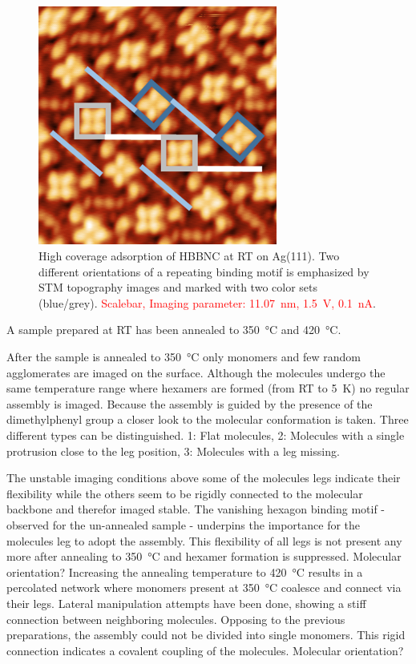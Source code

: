 \begin{figure}[] \centering
	\includegraphics[width=0.7\textwidth]{./images/hbbnc-ag-111-rt-high-coverage}
	\caption{High coverage adsorption of HBBNC at RT on Ag(111). Two different orientations of a repeating binding motif is emphasized by STM topography images and marked with two color sets (blue/grey). \textcolor{red}{Scalebar, Imaging parameter: \SI{11.07}{\nano \meter}, \SI{1.5}{\volt}, \SI{0.1}{\nano \ampere}}.}
	\label{}
\end{figure}

A sample prepared at RT has been annealed to \SI{350}{\celsius} and \SI{420}{\celsius}.

After the sample is annealed to \SI{350}{\celsius} only monomers and few random agglomerates are imaged on the surface. Although the molecules undergo the same temperature range where hexamers are formed (from RT to \SI{5}{\kelvin}) no regular assembly is imaged. Because the assembly is guided by the presence of the dimethylphenyl group a closer look to the molecular conformation is taken. Three different types can be distinguished. 1: Flat molecules, 2: Molecules with a single protrusion close to the leg position, 3: Molecules with a leg missing.

The unstable imaging conditions above some of the molecules legs indicate their flexibility while the others seem to be rigidly connected to the molecular backbone and therefor imaged stable. The vanishing hexagon binding motif - observed for the un-annealed sample - underpins the importance for the molecules leg to adopt the assembly. This flexibility of all legs is not present any more after annealing to \SI{350}{\celsius} and hexamer formation is suppressed. Molecular orientation?
Increasing the annealing temperature to \SI{420}{\celsius} results in a percolated network where monomers present at \SI{350}{\celsius} coalesce and connect via their legs. Lateral manipulation attempts have been done, showing a stiff connection between neighboring molecules. Opposing to the previous preparations, the assembly could not be divided into single monomers. This rigid connection indicates a covalent coupling of the molecules. 
Molecular orientation?

